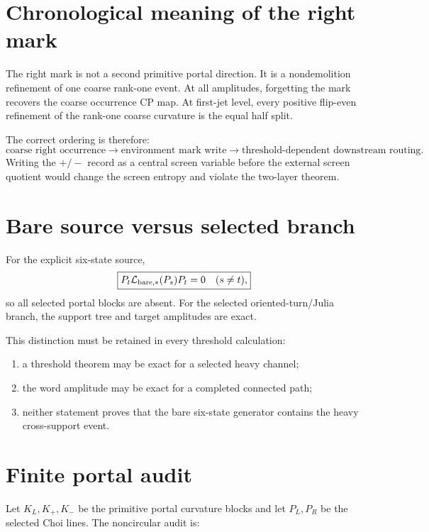 \documentclass[11pt,oneside,openany]{book}
\numberwithin{equation}{chapter}
\theoremstyle{definition}
\theoremstyle{remark}
\begin{document}
\section{Chronological meaning of the right mark}

The right mark is not a second primitive portal direction.  It is a
nondemolition refinement of one coarse rank-one event.  At all amplitudes,
forgetting the mark recovers the coarse occurrence CP map.  At first-jet
level, every positive flip-even refinement of the rank-one coarse curvature
is the equal half split.

The correct ordering is therefore:
\[
 \boxed{
 \text{coarse right occurrence}
 \longrightarrow
 \text{environment mark write}
 \longrightarrow
 \text{threshold-dependent downstream routing}.}
\]
Writing the \(+\!/\!-\) record as a central screen variable before the
external screen quotient would change the screen entropy and violate the
two-layer theorem.

\section{Bare source versus selected branch}

For the explicit six-state source,
\[
 \boxed{
 P_t\mathcal L_{\rm bare,*}(P_s)P_t=0
 \quad
 (s\ne t),}
\]
so all selected portal blocks are absent.  For the selected
oriented-turn/Julia branch, the support tree and target amplitudes are exact.

This distinction must be retained in every threshold calculation:

\begin{enumerate}[label=\textup{(\roman*)},leftmargin=2.2em]
\item a threshold theorem may be exact for a selected heavy channel;
\item the word amplitude may be exact for a completed connected path;
\item neither statement proves that the bare six-state generator contains
      the heavy cross-support event.
\end{enumerate}

\section{Finite portal audit}

Let \(K_L,K_+,K_-\) be the primitive portal curvature blocks and let \(P_L,P_R\)
be the selected Choi lines.  The noncircular audit is:
\end{document}

